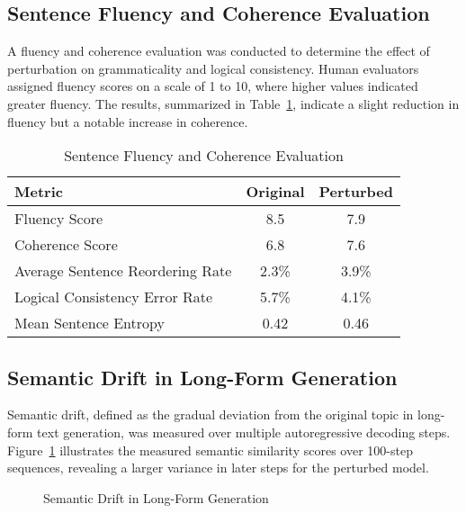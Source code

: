 \documentclass[5p,times]{elsarticle}
\begin{document}
\subsection{Sentence Fluency and Coherence Evaluation}

A fluency and coherence evaluation was conducted to determine the effect of perturbation on grammaticality and logical consistency. Human evaluators assigned fluency scores on a scale of 1 to 10, where higher values indicated greater fluency. The results, summarized in Table~\ref{tab:fluency}, indicate a slight reduction in fluency but a notable increase in coherence.

\begin{table}[ht]
	\centering
	\begin{tabular}{lcc}
		\hline
		\textbf{Metric} & \textbf{Original} & \textbf{Perturbed} \\
		\hline
		Fluency Score & 8.5 & 7.9 \\
		Coherence Score & 6.8 & 7.6 \\
		Average Sentence Reordering Rate & 2.3\% & 3.9\% \\
		Logical Consistency Error Rate & 5.7\% & 4.1\% \\
		Mean Sentence Entropy & 0.42 & 0.46 \\
		\hline
	\end{tabular}
	\caption{Sentence Fluency and Coherence Evaluation}
	\label{tab:fluency}
\end{table}

\subsection{Semantic Drift in Long-Form Generation}

Semantic drift, defined as the gradual deviation from the original topic in long-form text generation, was measured over multiple autoregressive decoding steps. Figure~\ref{fig:semantic_drift} illustrates the measured semantic similarity scores over 100-step sequences, revealing a larger variance in later steps for the perturbed model.

\begin{figure}[ht]
	\centering
	\caption{Semantic Drift in Long-Form Generation}
	\label{fig:semantic_drift}
\end{figure}
\end{document}
